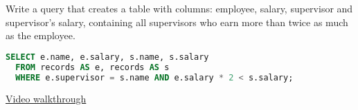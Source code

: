 \question Write a query that creates a table with columns: employee,
salary, supervisor and supervisor's salary, containing all supervisors who
earn more than twice as much as the employee.

\begin{solution}[1in]
\begin{lstlisting}[language=SQL]
SELECT e.name, e.salary, s.name, s.salary
  FROM records AS e, records AS s
  WHERE e.supervisor = s.name AND e.salary * 2 < s.salary;
\end{lstlisting}
\href{https://youtu.be/BIV5O1U9Zdw?t=1m25s}{Video walkthrough}
\end{solution}
